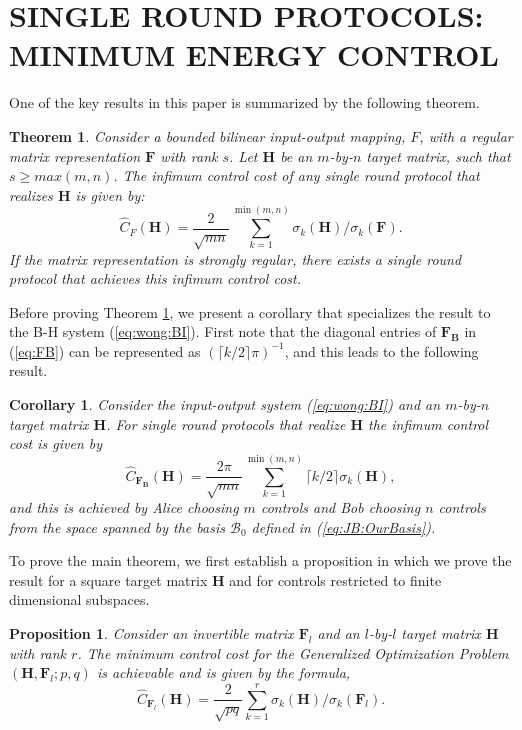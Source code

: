 \documentclass[12pt,onecolumn,draftcls]{IEEEtran}
\newcommand{\bB}{\mathbf{B}}
\newcommand{\bF}{\mathbf{F}}
\newtheorem{theorem}{Theorem}[section]
\newtheorem{corollary}{Corollary}[section]
\newtheorem{proposition}{Proposition}[section]
\begin{document}
\section{SINGLE ROUND PROTOCOLS: MINIMUM ENERGY CONTROL}\setcounter{equation}{0}

One of the key results in this paper is summarized by the following theorem.

\begin{theorem}
\label{thm:1}
Consider a bounded bilinear input-output mapping, $F$, with a regular matrix representation $\mathbf{F}$ with rank $s$.
Let $\mathbf{H}$ be an $m$-by-$n$ target matrix, such that
$s \geq max(m,n)$. 
The infimum control cost of any single round protocol that realizes $\mathbf{H}$ is given by:
\begin{equation}
\hat{C}_F(\mathbf{H}) =
\frac{2}{\sqrt{mn}}
\sum_{k=1}^{\min(m,n)} \sigma_{k}(\mathbf{H})/\sigma_{k}(\mathbf{F}).
\label{eqn:thm1}
\end{equation}
If the matrix representation is strongly regular, there exists a single round protocol that achieves this infimum control cost.
\end{theorem}

Before proving Theorem \ref{thm:1}, we present a  corollary that specializes the result to the B-H system (\ref{eq:wong:BI}). 
First note that the diagonal entries of $\mathbf{F_B}$ in (\ref{eq:FB}) can be represented as $(\lceil k/2 \rceil \pi)^{-1}$, and this leads to the following result.

\begin{corollary}
\label{cor:1}
Consider the input-output system (\ref{eq:wong:BI}) and an $m$-by-$n$ target matrix $\mathbf{H}$.
For single round protocols that realize $\mathbf{H}$ the infimum control cost is given by
\begin{equation}
\hat{C}_{\bF_\bB}(\mathbf{H}) =\frac{2\pi}{\sqrt{mn}}
\sum_{k=1}^{\min(m,n)} \lceil k/2 \rceil  \sigma_{k}(\mathbf{H}),\label{eq:thm5.1}
\end{equation}
and this is achieved by Alice choosing $m$ controls and Bob choosing $n$ controls
from  the space spanned by the basis $\mathcal{B}_0$ defined in (\ref{eq:JB:OurBasis}).
\end{corollary}

To prove the main theorem, we first establish a proposition in which we prove the result for
a square target matrix $\mathbf{H}$ and for controls restricted to finite dimensional subspaces.

\begin{proposition}
\label{prop:1}
Consider an invertible matrix $\mathbf{F}_l$ and an $l$-by-$l$ target matrix $\mathbf{H}$ with rank $r$.
The minimum control cost for the Generalized Optimization Problem $(\mathbf{H}, \mathbf{F}_l;p,q)$
is achievable and is given by the formula,
\begin{equation}
\hat{C}_{\mathbf{F}_l}(\mathbf{H})=
\frac{2}{\sqrt{pq}}
\sum_{k=1}^{r} \sigma_{k}(\mathbf{H})/\sigma_{k}(\mathbf{F}_l).
\label{eq:prop1.1}
\end{equation}
\end{proposition}
\end{document}
